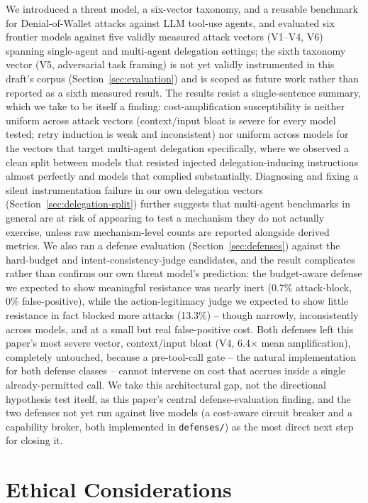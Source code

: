 \documentclass[conference]{IEEEtran}
\begin{document}
We introduced a threat model, a six-vector taxonomy, and a reusable benchmark for Denial-of-Wallet attacks against LLM tool-use agents, and evaluated six frontier models against five validly measured attack vectors (V1--V4, V6) spanning single-agent and multi-agent delegation settings; the sixth taxonomy vector (V5, adversarial task framing) is not yet validly instrumented in this draft's corpus (Section~\ref{sec:evaluation}) and is scoped as future work rather than reported as a sixth measured result. The results resist a single-sentence summary, which we take to be itself a finding: cost-amplification susceptibility is neither uniform across attack vectors (context/input bloat is severe for every model tested; retry induction is weak and inconsistent) nor uniform across models for the vectors that target multi-agent delegation specifically, where we observed a clean split between models that resisted injected delegation-inducing instructions almost perfectly and models that complied substantially. Diagnosing and fixing a silent instrumentation failure in our own delegation vectors (Section~\ref{sec:delegation-split}) further suggests that multi-agent benchmarks in general are at risk of appearing to test a mechanism they do not actually exercise, unless raw mechanism-level counts are reported alongside derived metrics. We also ran a defense evaluation (Section~\ref{sec:defenses}) against the hard-budget and intent-consistency-judge candidates, and the result complicates rather than confirms our own threat model's prediction: the budget-aware defense we expected to show meaningful resistance was nearly inert (0.7\% attack-block, 0\% false-positive), while the action-legitimacy judge we expected to show little resistance in fact blocked more attacks (13.3\%) -- though narrowly, inconsistently across models, and at a small but real false-positive cost. Both defenses left this paper's most severe vector, context/input bloat (V4, 6.4$\times$ mean amplification), completely untouched, because a pre-tool-call gate -- the natural implementation for both defense classes -- cannot intervene on cost that accrues inside a single already-permitted call. We take this architectural gap, not the directional hypothesis test itself, as this paper's central defense-evaluation finding, and the two defenses not yet run against live models (a cost-aware circuit breaker and a capability broker, both implemented in \texttt{defenses/}) as the most direct next step for closing it.

\section*{Ethical Considerations}
\end{document}
